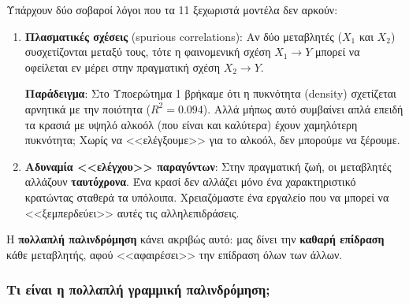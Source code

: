 \documentclass[12pt,a4paper]{article}
\begin{document}
\begin{theorybox}
Υπάρχουν δύο σοβαροί λόγοι που τα 11 ξεχωριστά μοντέλα δεν αρκούν:

\begin{enumerate}
    \item \textbf{Πλασματικές σχέσεις} (spurious correlations): Αν δύο μεταβλητές ($X_1$ και $X_2$) συσχετίζονται μεταξύ τους, τότε η φαινομενική σχέση $X_1 \to Y$ μπορεί να οφείλεται εν μέρει στην πραγματική σχέση $X_2 \to Y$.

    \textbf{Παράδειγμα}: Στο Υποερώτημα 1 βρήκαμε ότι η πυκνότητα (density) σχετίζεται αρνητικά με την ποιότητα ($R^2 = 0.094$). Αλλά μήπως αυτό συμβαίνει απλά επειδή τα κρασιά με υψηλό αλκοόλ (που είναι και καλύτερα) έχουν χαμηλότερη πυκνότητα; Χωρίς να <<ελέγξουμε>> για το αλκοόλ, δεν μπορούμε να ξέρουμε.

    \item \textbf{Αδυναμία <<ελέγχου>> παραγόντων}: Στην πραγματική ζωή, οι μεταβλητές αλλάζουν \textbf{ταυτόχρονα}. Ένα κρασί δεν αλλάζει μόνο ένα χαρακτηριστικό κρατώντας σταθερά τα υπόλοιπα. Χρειαζόμαστε ένα εργαλείο που να μπορεί να <<ξεμπερδεύει>> αυτές τις αλληλεπιδράσεις.
\end{enumerate}

Η \textbf{πολλαπλή παλινδρόμηση} κάνει ακριβώς αυτό: μας δίνει την \textbf{καθαρή επίδραση} κάθε μεταβλητής, αφού <<αφαιρέσει>> την επίδραση όλων των άλλων.
\end{theorybox}

\subsubsection{Τι είναι η πολλαπλή γραμμική παλινδρόμηση;}
\end{document}
